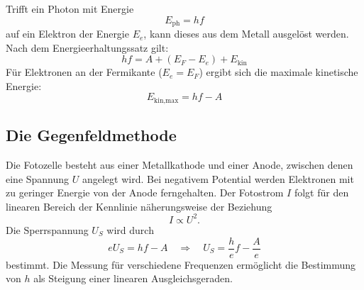 Trifft ein Photon mit Energie
\begin{equation}
\label{eq:photonenenergie}
E_\text{ph} = h f
\end{equation}
auf ein Elektron der Energie $E_e$, kann dieses aus dem Metall ausgelöst werden. Nach dem Energieerhaltungssatz gilt:
\begin{equation}
\label{eq:einstein}
h f = A + (E_F - E_e) + E_\text{kin}
\end{equation}
Für Elektronen an der Fermikante ($E_e = E_F$) ergibt sich die maximale kinetische Energie:
\begin{equation}
\label{eq:maxEkin}
E_\text{kin,max} = h f - A
\end{equation}

\subsection{Die Gegenfeldmethode}

Die Fotozelle besteht aus einer Metallkathode und einer Anode, zwischen denen eine Spannung $U$ angelegt wird. Bei negativem Potential werden Elektronen mit zu geringer Energie von der Anode ferngehalten. Der Fotostrom $I$ folgt für den linearen Bereich der Kennlinie näherungsweise der Beziehung
\begin{equation}
\label{eq:stromspannung}
I \propto U^2.
\end{equation}
Die Sperrspannung $U_S$ wird durch
\begin{equation}
\label{eq:sperrspannung}
e U_S = h f - A \quad \Rightarrow \quad U_S = \frac{h}{e} f - \frac{A}{e}
\end{equation}
bestimmt. Die Messung für verschiedene Frequenzen ermöglicht die Bestimmung von $h$ als Steigung einer linearen Ausgleichsgeraden.

